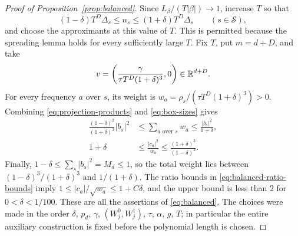 \begin{proof}[Proof of Proposition~\ref{prop:balanced}]
Since $L_\beta/(T|\beta|)\to1$, increase $T$ so that
\begin{equation}\label{eq:box-sizes}
 (1-\delta)T^D\Delta_s\le n_s\le(1+\delta)T^D\Delta_s
 \qquad(s\in\mathcal S),
\end{equation}
and choose the approximants at this value of $T$.  This is permitted
because the spreading lemma holds for every sufficiently large $T$.
Fix $T$, put $m=d+D$, and take
\[
 v=\left(\frac{\gamma}{\tau T^D(1+\delta)^3},0\right)\in\mathbb R^{d+D}.
\]
For every frequency $a$ over $s$, its weight is
$w_a=\rho_s/(\tau T^D(1+\delta)^3)>0$.
Combining \eqref{eq:projection-products} and \eqref{eq:box-sizes} gives
\begin{align}
 \frac{(1-\delta)^2}{(1+\delta)^3}|b_s|^2
 &\le\sum_{a\text{ over }s}w_a\le\frac{|b_s|^2}{1+\delta},
 \label{eq:balanced-weight-bounds}\\
 1+\delta&\le\frac{|c_a|^2}{w_a}
 \le\frac{(1+\delta)^3}{(1-\delta)^2}.
 \label{eq:balanced-ratio-bounds}
\end{align}
Finally, $1-\delta\le\sum_s|b_s|^2=M_d\le1$, so the total weight lies
between $(1-\delta)^3/(1+\delta)^3$ and $1/(1+\delta)$.
The ratio bounds in \eqref{eq:balanced-ratio-bounds} imply
$1\le|c_a|/\sqrt{w_a}\le1+C\delta$, and the upper bound is less than
$2$ for $0<\delta<1/100$.  These are all the assertions of
\eqref{eq:balanced}.  The choices were made in the order
$\delta$, $p_d$, $\gamma$, $(W_j^0,W_j^1)$, $\tau$, $\alpha$, $g$, $T$;
in particular the entire auxiliary construction is fixed before the
polynomial length is chosen.
\end{proof}
